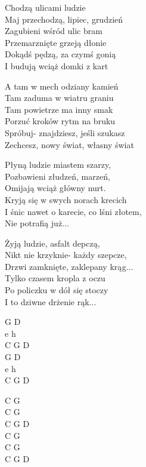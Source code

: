 
\begin{text}
    Chodzą ulicami ludzie\\
    Maj przechodzą, lipiec, grudzień\\
    Zagubieni wśród ulic bram\\
    Przemarznięte grzeją dłonie\\
    Dokądś pędzą, za czymś gonią\\
    I budują wciąż domki z kart

    \vin A tam w mech odziany kamień\\
    \vin Tam zaduma w wiatru graniu\\
    \vin Tam powietrze ma inny smak\\
    \vin Porzuć kroków rytm na bruku\\
    \vin Spróbuj- znajdziesz, jeśli szukasz\\
    \vin Zechcesz, nowy świat, własny świat

    Płyną ludzie miastem szarzy,\\
    Pozbawieni złudzeń, marzeń,\\
    Omijają wciąż główny nurt.\\
    Kryją się w swych norach krecich\\
    I śnic nawet o karecie, co lśni złotem,\\
    Nie potrafią już...

    Żyją ludzie, asfalt depczą,\\
    Nikt nie krzyknie- każdy szepcze,\\
    Drzwi zamknięte, zaklepany krąg...\\
    Tylko czasem kropla z oczu\\
    Po policzku w dół się stoczy\\
    I to dziwne drżenie rąk...
\end{text}
\begin{chord}
    G D\\
    e h\\
    C G D\\
    G D\\
    e h\\
    C G D

    C G\\
    C G\\
    C G D\\
    C G\\
    C G\\
    C G D
\end{chord}